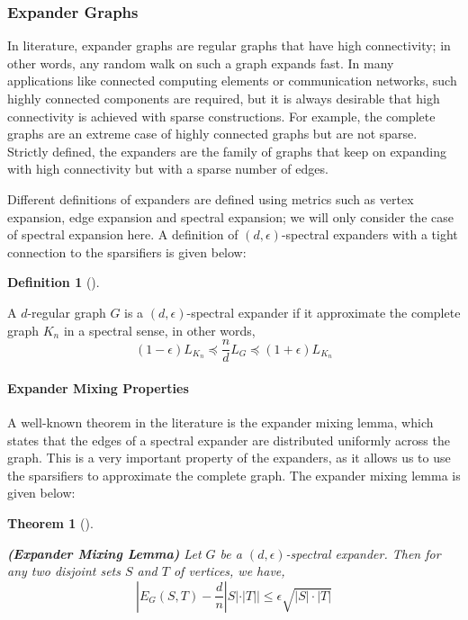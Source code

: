 \documentclass[
  letterpaper,
  DIV=11,
  numbers=noendperiod]{scrartcl}
\let\oldparagraph\paragraph
\renewcommand{\paragraph}[1]{\oldparagraph{#1}\mbox{}}
\theoremstyle{plain}
\theoremstyle{plain}
\theoremstyle{plain}
\theoremstyle{definition}
\newtheorem{definition}{Definition}[section]
\theoremstyle{plain}
\newtheorem{theorem}{Theorem}[section]
\theoremstyle{remark}
\begin{document}
\hypertarget{expander-graphs}{%
\subsubsection{Expander Graphs}\label{expander-graphs}}

In literature, expander graphs are regular graphs that have high
connectivity; in other words, any random walk on such a graph expands
fast. In many applications like connected computing elements or
communication networks, such highly connected components are required,
but it is always desirable that high connectivity is achieved with
sparse constructions. For example, the complete graphs are an extreme
case of highly connected graphs but are not sparse. Strictly defined,
the expanders are the family of graphs that keep on expanding with high
connectivity but with a sparse number of edges.

Different definitions of expanders are defined using metrics such as
vertex expansion, edge expansion and spectral expansion; we will only
consider the case of spectral expansion here. A definition of
\((d, \epsilon)\)-spectral expanders with a tight connection to the
sparsifiers is given below:

\leavevmode{}%
\begin{definition}[]\label{def-spectral-expander}

A \(d\)-regular graph \(G\) is a \((d, \epsilon)\)-spectral expander if
it approximate the complete graph \(K_n\) in a spectral sense, in other
words,
\[(1 - \epsilon) L_{K_n} \preceq \frac{n}{d} L_G \preceq (1 + \epsilon) L_{K_n}\]

\end{definition}

\hypertarget{expander-mixing-properties}{%
\paragraph{Expander Mixing
Properties}\label{expander-mixing-properties}}

A well-known theorem in the literature is the expander mixing lemma,
which states that the edges of a spectral expander are distributed
uniformly across the graph. This is a very important property of the
expanders, as it allows us to use the sparsifiers to approximate the
complete graph. The expander mixing lemma is given below:

\leavevmode{}%
\begin{theorem}[]\label{thm-expander-mixing-lemma}

\textbf{(Expander Mixing Lemma)} Let \(G\) be a
\((d, \epsilon)\)-spectral expander. Then for any two disjoint sets
\(S\) and \(T\) of vertices, we have,
\[|E_G(S, T) - \frac{d}{n} |S| \cdot |T| | \le \epsilon \sqrt{|S| \cdot |T|}\]

\end{theorem}
\end{document}
